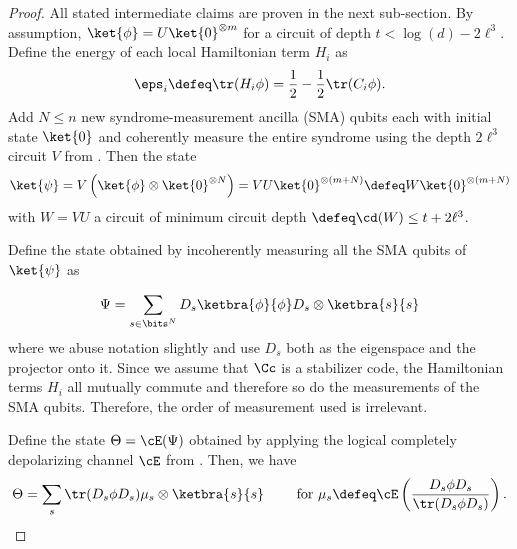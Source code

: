 \documentclass{toc}
\begin{document}
\begin{proof}
All stated intermediate claims are proven in the next sub-section. By assumption, $\ket{\phi} = U \ket{0}^{\otimes m}$ for a circuit of depth $t < \log(d) - 2 \ell^3$. Define the energy of each local Hamiltonian term $H_i$ as
\begin{align}
    \eps_i \defeq \tr(H_i \phi) = \frac{1}{2} - \frac{1}{2} \tr(C_i \phi).
\end{align}
Add $N \leq n$ new syndrome-measurement ancilla (SMA) qubits each with initial state $\ket{0}$ and coherently measure the entire syndrome using the depth $2 \ell^3$ circuit $V$ from . Then the state
\begin{align}
    \ket{\psi} = V \left(\ket{\phi} \otimes \ket{0}^{\otimes N}\right) = V U \ket{0}^{\otimes(m + N)} \defeq W \ket{0}^{\otimes (m + N)}
\end{align}
with $W = VU$ a circuit of minimum circuit depth $\defeq \cd(W) \leq t + 2 \ell^3$.

Define the state obtained by incoherently measuring all the SMA qubits of $\ket{\psi}$ as 

\begin{align}
    \Psi = \sum_{s \in \bits^{N}} D_s \ketbra{\phi}{\phi} D_s \otimes \ketbra{s}{s}
\end{align}
where we abuse notation slightly and use $D_s$ both as the eigenspace and the projector onto it. Since we assume that $\Cc$ is a stabilizer code, the Hamiltonian terms $H_i$ all mutually commute and therefore so do the measurements of the SMA qubits. Therefore, the order of measurement used is irrelevant.

Define the state $\Theta = \cE(\Psi)$ obtained by applying the logical completely depolarizing channel $\cE$ from . Then, we have
\begin{align}
    \Theta = \sum_s \tr(D_s \phi D_s) \mu_s \otimes \ketbra{s}{s} \qquad \text{ for } \mu_s \defeq \cE \left( \frac{D_s \phi D_s}{\tr(D_s \phi D_s)} \right).
\end{align}


\end{proof}
\end{document}
